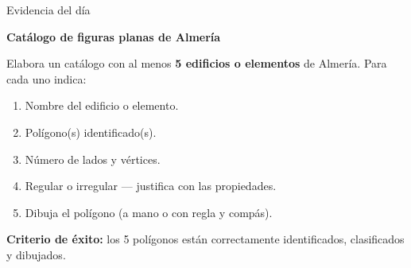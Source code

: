 \documentclass[aspectratio=169, 10pt, spanish]{beamer}
\begin{document}
\begin{frame}{Evidencia del día}
  \begin{evidenciabox}
    \textbf{Catálogo de figuras planas de Almería}

    \vspace{0.3cm}
    Elabora un catálogo con al menos \textbf{5 edificios o elementos}
    de Almería. Para cada uno indica:

    \vspace{0.15cm}
    \begin{enumerate}
      \item Nombre del edificio o elemento.
      \item Polígono(s) identificado(s).
      \item Número de lados y vértices.
      \item Regular o irregular — justifica con las propiedades.
      \item Dibuja el polígono (a mano o con regla y compás).
    \end{enumerate}

    \vspace{0.2cm}
    \textbf{Criterio de éxito:} los 5 polígonos están correctamente
    identificados, clasificados y dibujados.
  \end{evidenciabox}
\end{frame}
\end{document}
